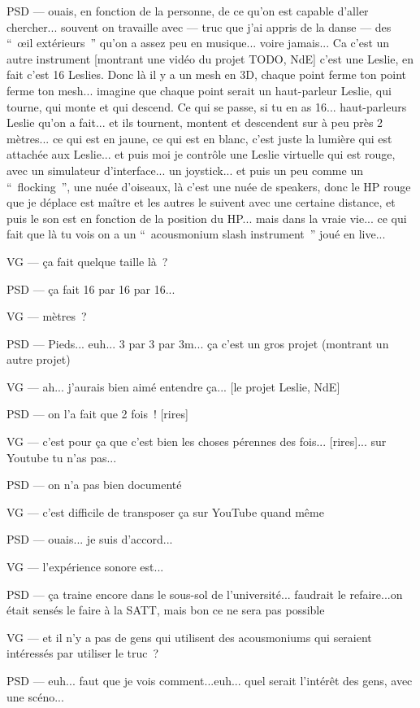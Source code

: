 PSD — ouais, en fonction de la personne, de ce qu'on est capable d'aller chercher... souvent on travaille avec — truc que j'ai appris de la danse — des “ œil extérieurs ” qu'on a assez peu en musique... voire jamais... Ca c'est un autre instrument [montrant une vidéo du projet TODO,  NdE] c'est une Leslie, en fait c'est 16 Leslies. Donc là il y a un mesh en 3D, chaque point ferme ton point ferme ton mesh... imagine que chaque point serait un haut-parleur Leslie, qui tourne, qui monte et qui descend. Ce qui se passe, si tu en as 16... haut-parleurs Leslie qu'on a fait... et ils tournent, montent et descendent sur à peu près 2 mètres... ce qui est en jaune, ce qui est en blanc, c'est juste la lumière qui est attachée aux Leslie... et puis moi je contrôle une Leslie virtuelle qui est rouge, avec un simulateur d'interface... un joystick... et puis un peu comme un “ flocking ”, une nuée d'oiseaux, là c'est une nuée de speakers, donc le HP rouge que je déplace est maître et les autres le suivent avec une certaine distance, et puis le son est en fonction de la position du HP... mais dans la vraie vie... ce qui fait que là tu vois on a un “ acousmonium slash instrument ” joué en live... 

VG — ça fait quelque taille là ?

PSD — ça fait 16 par 16 par 16... 

VG — mètres ?

PSD — Pieds... euh... 3 par 3 par 3m... ça c'est un gros projet (montrant un autre projet)

VG — ah... j'aurais bien aimé entendre ça... [le projet Leslie,  NdE]

PSD — on l'a fait que 2 fois ! [rires]

VG — c'est pour ça que c'est bien les choses pérennes des fois... [rires]... sur Youtube tu n'as pas...

PSD — on n'a pas bien documenté

VG — c'est difficile de transposer ça sur YouTube quand même

PSD — ouais... je suis d'accord...

VG — l'expérience sonore est...

PSD — ça traine encore dans le sous-sol de l'université... faudrait le refaire...on était sensés le faire à la SATT, mais bon ce ne sera pas possible

VG — et il n'y a pas de gens qui utilisent des acousmoniums qui seraient intéressés par utiliser le truc ?

PSD — euh... faut que je vois comment...euh... quel serait l'intérêt des gens, avec une scéno...

